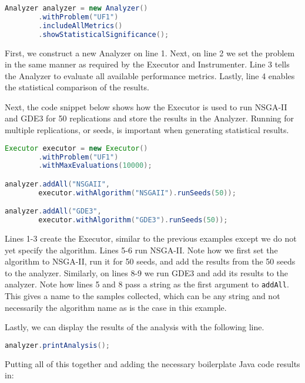 \begin{lstlisting}[language=Java]
Analyzer analyzer = new Analyzer()
		.withProblem("UF1")
		.includeAllMetrics()
		.showStatisticalSignificance();
\end{lstlisting}

First, we construct a new Analyzer on line 1.  Next, on line 2 we set the problem in the same manner as required by the Executor and Instrumenter.  Line 3 tells the Analyzer to evaluate all available performance metrics.  Lastly, line 4 enables the statistical comparison of the results.

Next, the code snippet below shows how the Executor is used to run NSGA-II and GDE3 for 50 replications and store the results in the Analyzer.  Running for multiple replications, or seeds, is important when generating statistical results.

\begin{lstlisting}[language=Java]
Executor executor = new Executor()
		.withProblem("UF1")
		.withMaxEvaluations(10000);

analyzer.addAll("NSGAII",  
		executor.withAlgorithm("NSGAII").runSeeds(50));

analyzer.addAll("GDE3",
		executor.withAlgorithm("GDE3").runSeeds(50));
\end{lstlisting}

Lines 1-3 create the Executor, similar to the previous examples except we do not yet specify the algorithm.  Lines 5-6 run NSGA-II.  Note how we first set the algorithm to NSGA-II, run it for 50 seeds, and add the results from the 50 seeds to the analyzer.  Similarly, on lines 8-9 we run GDE3 and add its results to the analyzer.  Note how lines 5 and 8 pass a string as the first argument to \texttt{addAll}.  This gives a name to the samples collected, which can be any string and not necessarily the algorithm name as is the case in this example.

Lastly, we can display the results of the analysis with the following line.

\begin{lstlisting}[language=Java]
analyzer.printAnalysis();
\end{lstlisting}

Putting all of this together and adding the necessary boilerplate Java code results in:

